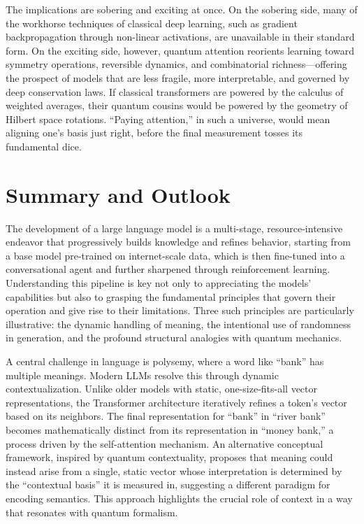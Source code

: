 \documentclass[%
  reprint,
  superscriptaddress,
  showpacs,
  showkeys,
  amsmath,amssymb,
  pra,
  longbibliography,
  floatfix,
  x11names
]{revtex4-2}
\begin{document}
The implications are sobering and exciting at once.
On the sobering side, many of the workhorse techniques of classical deep learning,
such as gradient backpropagation through non-linear activations,
are unavailable in their standard form. On the exciting side, however,
quantum attention reorients learning toward symmetry operations, reversible dynamics,
and combinatorial richness---offering the prospect of
models that are less fragile, more interpretable, and governed by deep conservation laws.
If classical transformers are powered by the calculus of weighted averages,
their quantum cousins would be powered by the geometry of Hilbert space rotations.
``Paying attention,'' in such a universe, would mean aligning one's basis just right,
before the final measurement tosses its fundamental dice.

\section{Summary and Outlook}

The development of a large language model is a multi-stage, resource-intensive endeavor that progressively builds knowledge and refines behavior, starting from a base model pre-trained on internet-scale data, which is then fine-tuned into a conversational agent and further sharpened through reinforcement learning. Understanding this pipeline is key not only to appreciating the models' capabilities but also to grasping the fundamental principles that govern their operation and give rise to their limitations. Three such principles are particularly illustrative: the dynamic handling of meaning, the intentional use of randomness in generation, and the profound structural analogies with quantum mechanics.

A central challenge in language is polysemy, where a word like ``bank'' has multiple meanings. Modern LLMs resolve this through dynamic contextualization. Unlike older models with static, one-size-fits-all vector representations, the Transformer architecture iteratively refines a token's vector based on its neighbors. The final representation for ``bank'' in ``river bank'' becomes mathematically distinct from its representation in ``money bank,'' a process driven by the self-attention mechanism. An alternative conceptual framework, inspired by quantum contextuality, proposes that meaning could instead arise from a single, static vector whose interpretation is determined by the ``contextual basis'' it is measured in, suggesting a different paradigm for encoding semantics. This approach highlights the crucial role of context in a way that resonates with quantum formalism.
\end{document}
